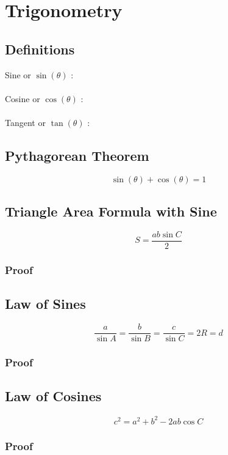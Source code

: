 \documentclass{article}
\begin{document}
\pagebreak

\section{Trigonometry}

\subsection{Definitions}

Sine or $\sin(\theta)$ :
\\ \\
Cosine or $\cos(\theta)$ :
\\ \\
Tangent or $\tan(\theta)$ :

\subsection{Pythagorean Theorem}
$$\sin (\theta)+\cos (\theta)=1$$

\subsection{Triangle Area Formula with Sine}

$$S=\frac{ab\sin C}{2}$$

\subsubsection{Proof}
\vspace{40px}


\subsection{Law of Sines}

$$\frac{a}{\sin A}=\frac{b}{\sin B}=\frac{c}{\sin C}=2R=d$$

\subsubsection{Proof}
\vspace{100px}

\subsection{Law of Cosines}
$$c^2=a^2+b^2-2 a b \cos C $$

\subsubsection{Proof}
\end{document}
